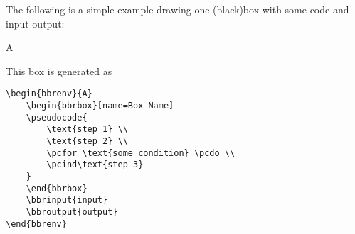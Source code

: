 \documentclass[a4paper]{report}
\begin{document}
The following is a simple example drawing one (black)box with some code and input output:
\begin{bbrenv}{A}
	\begin{bbrbox}[name=Box Name]
	\end{bbrbox}
\end{bbrenv}
This box is generated as
\begin{lstlisting}
\begin{bbrenv}{A}
	\begin{bbrbox}[name=Box Name]
	\pseudocode{
		\text{step 1} \\
		\text{step 2} \\
		\pcfor \text{some condition} \pcdo \\
		\pcind\text{step 3} 
	}
	\end{bbrbox}
	\bbrinput{input}
	\bbroutput{output}
\end{bbrenv}
\end{lstlisting}
\end{document}
